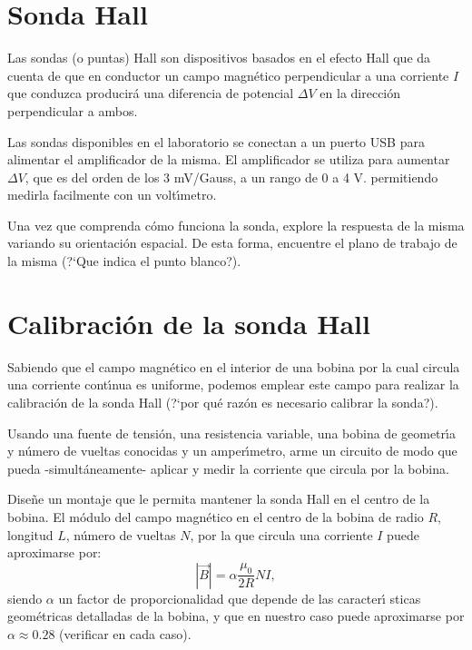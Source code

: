 \documentclass[laboratorio]{guia}
\begin{document}
 
\maketitle

\section{Sonda Hall}

Las sondas (o puntas) Hall son dispositivos basados en el efecto Hall que da cuenta de que en conductor un campo magnético  perpendicular a una corriente \(I\) que conduzca producirá una diferencia de potencial \(\Delta V\) en la dirección perpendicular a ambos.

Las sondas disponibles en el laboratorio se conectan a un puerto USB para alimentar el amplificador de la misma.
El amplificador se utiliza para aumentar \(\Delta V\), que es del orden de los 3 mV/Gauss, a un rango de 0 a 4 V. permitiendo medirla facilmente con un volt\'\i metro. 

Una vez que comprenda c\'omo funciona la sonda, explore la
respuesta de la misma variando su orientaci\'on espacial. De esta forma,
encuentre el plano de trabajo de la misma (?`Que indica el punto blanco?). 


\section{Calibraci\'on de la sonda Hall}

Sabiendo que el campo magn\'etico en el interior de una bobina por la cual
circula una corriente cont\'\i nua es uniforme, podemos emplear este campo para 
realizar la calibraci\'on de la sonda Hall (?`por qu\'e raz\'on es necesario
calibrar la sonda?). 

Usando una fuente de tensi\'on, una resistencia variable, una bobina de
geometr\'\i a y n\'umero de vueltas conocidas y un amper\'\i metro, arme un
circuito de modo que pueda -simult\'aneamente- aplicar y medir la corriente que
circula por la bobina. 

Dise\~ne un montaje que le permita mantener la sonda Hall en el centro de la
bobina. El m\'odulo del campo magn\'etico en el centro de la bobina de radio $R$, longitud
$L$, n\'umero de vueltas $N$, por la que circula una corriente $I$ puede
aproximarse por:
\begin{equation}
    |\vec{B}| = \alpha \frac{\mu_0}{2R} N I,
    \end{equation}
siendo $\alpha$ un factor de proporcionalidad que depende de las caracter\'\i
sticas geom\'etricas detalladas de la bobina, y que en nuestro caso puede
aproximarse por $\alpha \approx 0.28$ (verificar en cada caso).
\end{document}
